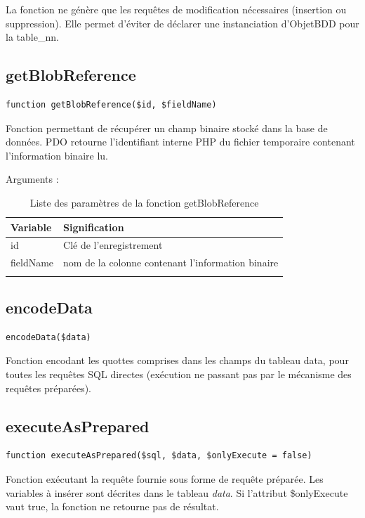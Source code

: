 La fonction ne génère que les requêtes de modification nécessaires (insertion ou suppression). Elle permet d'éviter de déclarer une instanciation d'ObjetBDD pour la table\_nn.

\subsection{getBlobReference}

\begin{lstlisting}
function getBlobReference($id, $fieldName)
\end{lstlisting}

Fonction permettant de récupérer un champ binaire stocké dans la base de données. PDO retourne l'identifiant interne PHP du fichier temporaire contenant l'information binaire lu.

Arguments :
\begin{longtable}{|p{3cm}|p{10cm}|}
\hline
\textbf{Variable} & \textbf{Signification} \\
\hline
\endhead
id & Clé de l'enregistrement \\
\hline
fieldName & nom de la colonne contenant l'information binaire \\
\hline
\caption{Liste des paramètres de la fonction getBlobReference}
\end{longtable}

\subsection{encodeData}

\begin{lstlisting}
encodeData($data)
\end{lstlisting}

Fonction encodant les quottes comprises dans les champs du tableau data, pour toutes les requêtes SQL directes (exécution ne passant pas par le mécanisme des requêtes préparées).

\subsection{executeAsPrepared}

\begin{lstlisting}
function executeAsPrepared($sql, $data, $onlyExecute = false) 
\end{lstlisting}

Fonction exécutant la requête fournie sous forme de requête préparée. Les variables à insérer sont décrites dans le tableau \textit{data}. Si l'attribut \$onlyExecute vaut true, la fonction ne retourne pas de résultat.

